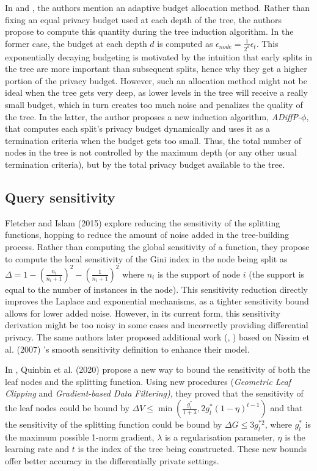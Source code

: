 In \cite{wen_wang} and \cite{nazanin}, the authors mention an adaptive budget allocation method. Rather than fixing an equal privacy budget used at each depth of the tree, the authors propose to compute this quantity during the tree induction algorithm. In the former case, the budget at each depth $d$ is computed as $\epsilon_{node} = \frac{1}{2^d}\epsilon_{t}$. This exponentially decaying budgeting is motivated by the intuition that early splits in the tree are more important than subsequent splits, hence why they get a higher portion of the privacy budget. However, such an allocation method might not be ideal when the tree gets very deep, as lower levels in the tree will receive a really small budget, which in turn creates too much noise and penalizes the quality of the tree. In the latter, the author proposes a new induction algorithm, \textit{ADiffP-$\phi$}, that computes each split's privacy budget dynamically and uses it as a termination criteria when the budget gets too small. Thus, the total number of nodes in the tree is not controlled by the maximum depth (or any other usual termination criteria), but by the total privacy budget available to the tree.

\subsection{Query sensitivity}\label{sec:query_sensitivity}

Fletcher and Islam (2015) \cite{fletcher_local} explore reducing the sensitivity of the splitting functions, hopping to reduce the amount of noise added in the tree-building process. Rather than computing the global sensitivity of a function, they propose to compute the local sensitivity of the Gini index in the node being split as $\Delta = 1 - (\frac{n_i}{n_i + 1})^2 - (\frac{1}{n_i + 1})^2$ where $n_i$ is the support of node $i$ (the support is equal to the number of instances in the node). This sensitivity reduction directly improves the Laplace and exponential mechanisms, as a tighter sensitivity bound allows for lower added noise. However, in its current form, this sensitivity derivation might be too noisy in some cases and incorrectly providing differential privacy. The same authors later proposed additional work (\cite{fletcher_signal}, \cite{fletcher_smooth}) based on Nissim et al. (2007) \cite{nissim}'s smooth sensitivity definition to enhance their model.

In \cite{dpgbdt}, Quinbin et al. (2020) propose a new way to bound the sensitivity of both the leaf nodes and the splitting function. Using new procedures (\textit{Geometric Leaf Clipping} and \textit{Gradient-based Data Filtering)}, they proved that the sensitivity of the leaf nodes could be bound by $\Delta V \leq \min(\frac{g_l^*}{1 + \lambda},2g_l^*(1-\eta)^{t-1})$ and that the sensitivity of the splitting function could be bound by $\Delta G \leq 3g_l^{*2}$, where $g_l^*$ is the maximum possible 1-norm gradient, $\lambda$ is a regularisation parameter, $\eta$ is the learning rate and $t$ is the index of the tree being constructed. These new bounds offer better accuracy in the differentially private settings.

